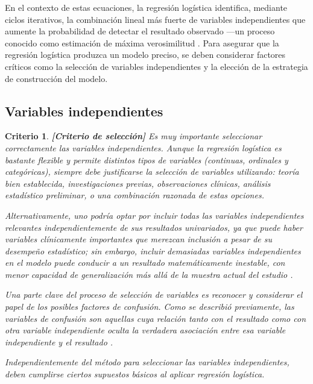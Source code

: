 \documentclass[12pt]{article}
\newtheorem{Criterio}{Criterio}%
\begin{document}
En el contexto de estas ecuaciones, la regresi\'on log\'istica identifica, mediante ciclos iterativos, la combinaci\'on lineal m\'as fuerte de variables independientes que aumente la probabilidad de detectar el resultado observado —un proceso conocido como estimaci\'on de m\'axima verosimilitud \cite{tabachnick2007,hosmer2000}. Para asegurar que la regresi\'on log\'istica produzca un modelo preciso, se deben considerar factores cr\'iticos como la selecci\'on de variables independientes y la elecci\'on de la estrategia de construcci\'on del modelo.

\subsection{Variables independientes}

\begin{Criterio}
\textbf{[Criterio de selecci\'on]} Es muy importante seleccionar correctamente las variables independientes. Aunque la regresi\'on log\'istica es bastante flexible y permite distintos tipos de variables (continuas, ordinales y categ\'oricas), siempre debe justificarse la selecci\'on de variables utilizando: teor\'ia bien establecida, investigaciones previas, observaciones cl\'inicas, an\'alisis estad\'istico preliminar, o una combinaci\'on razonada de estas opciones.

Alternativamente, uno podr\'ia optar por incluir todas las variables independientes relevantes independientemente de sus resultados univariados, ya que puede haber variables cl\'inicamente importantes que merezcan inclusi\'on a pesar de su desempe\~no estad\'istico; sin embargo,  incluir demasiadas variables independientes en el modelo puede conducir a un resultado matem\'aticamente inestable, con menor capacidad de generalizaci\'on m\'as all\'a de la muestra actual del estudio \cite{tabachnick2007,hosmer2000}.

Una parte clave del proceso de selecci\'on de variables es reconocer y considerar el papel de los posibles factores de confusi\'on. Como se describi\'o previamente, las variables de confusi\'on son aquellas cuya relaci\'on tanto con el resultado como con otra variable independiente oculta la verdadera asociaci\'on entre esa variable independiente y el resultado \cite{darlington1990,hosmer2000}.

Independientemente del m\'etodo para seleccionar las variables independientes, deben cumplirse ciertos supuestos b\'asicos al aplicar regresi\'on log\'istica. 


\end{Criterio}
\end{document}
